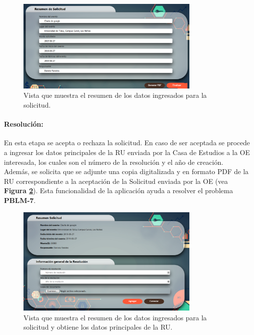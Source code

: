     \begin{figure}[h]
        \centering
        \includegraphics[width= 0.8\textwidth]{Imagenes/Resumen.PNG}
        \caption{\label{fig: ResumenSolicitud}Vista que muestra el resumen de los datos ingresados para la solicitud.}
    \end{figure}

\paragraph{Resolución: } En esta etapa se acepta o rechaza la solicitud. En caso de ser aceptada se procede a ingresar los datos principales de la RU enviada por la Casa de Estudios a la OE interesada, los cuales son el número de la resolución y el año de creación. Además, se solicita que se adjunte una copia digitalizada y en formato PDF de la RU correspondiente a la aceptación de la Solicitud enviada por la OE (vea \textbf{Figura \ref{fig: Resolucion}}). Esta funcionalidad de la aplicación ayuda a resolver el problema \textbf{PBLM-7}.

\begin{figure}[h]
    \centering
    \includegraphics[width= 0.8\textwidth]{Imagenes/Resolucion.PNG}
    \caption{\label{fig: Resolucion}Vista que muestra el resumen de los datos ingresados para la solicitud y obtiene los datos principales de la RU.}
\end{figure}


